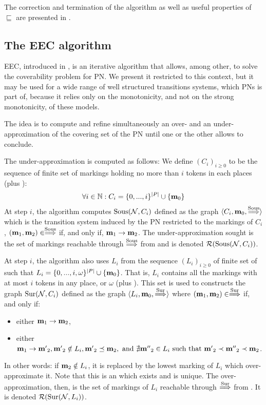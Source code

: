 The correction and termination of the algorithm as well as useful properties of $\sqsubseteq$ are presented in \cite{Geeraerts07, Ganty09}.

\subsection{The \ac{EEC} algorithm}
\label{sec:eec}

\ac{EEC}, introduced in \cite{Geeraerts07thesis, Geeraerts06}, is an iterative algorithm that allows, among other, to solve the coverability problem for \ac{PN}.
We present it restricted to this context, but it may be used for a wide range of well structured transitions systems, which \acp{PN} is part of, because it relies only on the monotonicity, and not on the strong monotonicity, of these models.

The idea is to compute and refine simultaneously an over- and an under-approximation of the covering set of the \ac{PN} until one or the other allows to conclude.

The under-approximation is computed as follows:
We define $(C_i)_{i \geq 0}$ to be the sequence of finite set of markings holding no more than $i$ tokens in each places (plus \marqi):
\[
  \forall i \in \mathbb{N} : C_i = \{0, ..., i\}^{|P|} \cup \{\mathbf{m}_0\}
\]
At step $i$, the algorithm computes $\operatorname{Sous}(\mathcal{N}, C_i)$ defined as the graph $\langle C_i, \mathbf{m}_0, \stackrel{\operatorname{Sous}}{\Longrightarrow} \rangle$ which is the transition system induced by the \ac{PN} \tupleN restricted to the markings of $C_i$,  $(\mathbf{m}_1, \mathbf{m}_2) \in \stackrel{\operatorname{Sous}}{\Longrightarrow}$ if, and only if, $\mathbf{m}_1 \rightarrow \mathbf{m}_2$.
The under-approximation sought is the set of markings reachable through $\stackrel{\operatorname{Sous}}{\Longrightarrow}$ from \marqi and is denoted $\operatorname{\mathcal{R}}(\operatorname{Sous}(\mathcal{N}, C_i))$.

At step $i$, the algorithm also uses $L_i$ from the sequence $(L_i)_{i \geq 0}$ of finite set of \omarks such that $L_i = \{0, ..., i, \omega \}^{|P|} \cup \{\mathbf{m}_0\}$.
That is, $L_i$ contains all the markings with at most $i$ tokens in any place, or $\omega$ (plus \marqi).
This set is used to constructs the graph $\operatorname{Sur}(\mathcal{N}, C_i)$ defined as the graph $\langle L_i, \mathbf{m}_0, \stackrel{\operatorname{Sur}}{\Longrightarrow} \rangle$ where $(\mathbf{m}_1, \mathbf{m}_2) \in \stackrel{\operatorname{Sur}}{\Longrightarrow}$ if, and only if:
\begin{itemize}
  \item either $\mathbf{m}_1 \rightarrow \mathbf{m}_2$,
  \item either $\mathbf{m}_1 \rightarrow \mathbf{m'}_2, \mathbf{m'}_2 \notin L_i, \mathbf{m'}_2 \preceq \mathbf{m}_2, \text{ and } \nexists \mathbf{m''}_2 \in L_i \text{ such that } \mathbf{m'}_2 \prec \mathbf{m''}_2 \prec \mathbf{m}_2$.
\end{itemize}
In other words: if $\mathbf{m}_2 \notin L_i$, it is replaced by the lowest marking of $L_i$ which over-approximate it.
Note that this is an \omark which exists and is unique. 
The over-approximation, then, is the set of markings of $L_i$ reachable through $\stackrel{\operatorname{Sur}}{\Longrightarrow}$ from \marqi. It is denoted $\operatorname{\mathcal{R}}(\operatorname{Sur}(\mathcal{N}, L_i))$.

